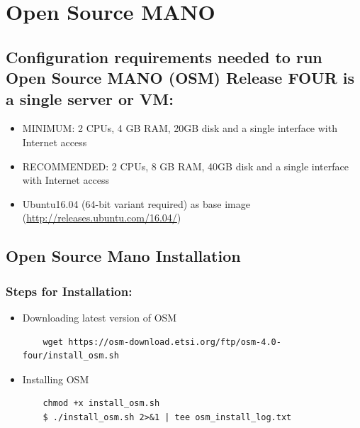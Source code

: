 \chapter{Open Source MANO}
\label{ch:osm}
\section{Configuration requirements needed to run Open Source MANO (OSM) Release FOUR is a single server or VM:}
		\begin{itemize}
	\item MINIMUM: 2 CPUs, 4 GB RAM, 20GB disk and a single interface with Internet access
	\item RECOMMENDED: 2 CPUs, 8 GB RAM, 40GB disk and a single interface with Internet access
	\item Ubuntu16.04 (64-bit variant required) as base image 
	(\hyperlink{name}{http://releases.ubuntu.com/16.04/})
		\end{itemize}
\section{Open Source Mano Installation}
\subsection{Steps for Installation:}
\begin{itemize}
	\item Downloading latest version of OSM
	\begin{lstlisting} 
	wget https://osm-download.etsi.org/ftp/osm-4.0-four/install_osm.sh
	\end{lstlisting}
	
	\item Installing OSM
	\begin{lstlisting} 
	chmod +x install_osm.sh
	$ ./install_osm.sh 2>&1 | tee osm_install_log.txt
\end{lstlisting}
\end{itemize}
